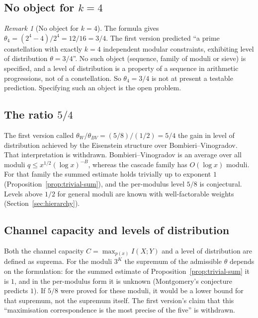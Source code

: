 \documentclass[12pt]{amsart}
\theoremstyle{plain}
\theoremstyle{definition}
\theoremstyle{remark}
\newtheorem{remark}[theorem]{Remark}
\newcommand{\thetaW}{\theta_W}
\newcommand{\thetaBV}{\theta_{BV}}
\begin{document}
\subsection{No object for $k=4$}

\begin{remark}[No object for $k = 4$]
\label{rem:k4}
The formula gives $\theta_4 = (2^4 - 4)/2^4 = 12/16 = 3/4$. The first version
predicted ``a prime constellation with exactly $k = 4$ independent modular
constraints, exhibiting level of distribution $\theta = 3/4$''. No such object
(sequence, family of moduli or sieve) is specified, and a level of distribution
is a property of a sequence in arithmetic progressions, not of a constellation.
So $\theta_4 = 3/4$ is not at present a testable prediction. Specifying such an
object is the open problem.
\end{remark}

\subsection{The ratio $5/4$}

The first version called $\thetaW / \thetaBV = (5/8)/(1/2) = 5/4$ the gain in
level of distribution achieved by the Eisenstein structure over
Bombieri--Vinogradov. That interpretation is withdrawn. Bombieri--Vinogradov is
an average over all moduli $q \leq x^{1/2}(\log x)^{-B}$, whereas the cascade
family has $O(\log x)$ moduli. For that family the summed estimate holds
trivially up to exponent $1$ (Proposition~\ref{prop:trivial-sum}), and the
per-modulus level $5/8$ is conjectural. Levels above $1/2$ for general moduli
are known with well-factorable weights (Section~\ref{sec:hierarchy}).

\subsection{Channel capacity and levels of distribution}

Both the channel capacity $C = \max_{p(x)} I(X;Y)$ and a level of distribution
are defined as suprema. For the moduli $3^K$ the supremum of the admissible
$\theta$ depends on the formulation: for the summed estimate of
Proposition~\ref{prop:trivial-sum} it is $1$, and in the per-modulus form it is
unknown (Montgomery's conjecture predicts $1$). If $5/8$ were proved for these
moduli, it would be a lower bound for that supremum, not the supremum itself. The first version's claim that this ``maximisation correspondence is the
most precise of the five'' is withdrawn.
\end{document}

